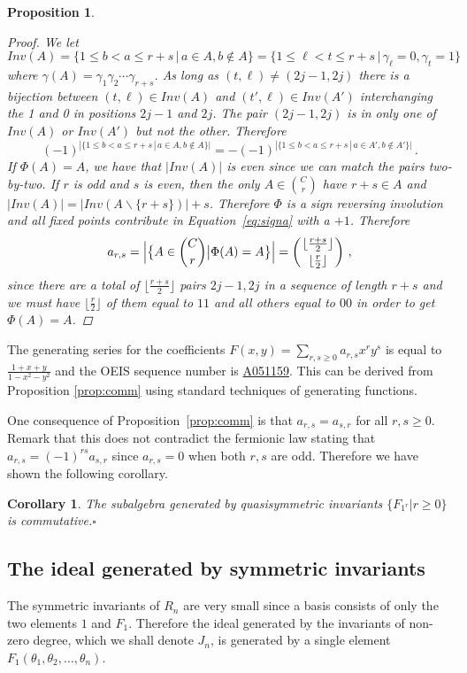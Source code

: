 \documentclass[11pt]{amsart}
\newtheorem{prop}[theorem]{Proposition}
\newtheorem{cor}[theorem]{Corollary}
\theoremstyle{definition}
\numberwithin{equation}{section}
\newcommand{\mike}[1]{\todo[size=\tiny,color=lime!30]{#1 \\ \hfill --- Mike}}
\begin{document}
\begin{prop}
\begin{proof}
We let
 $$Inv(A)=\{1\le b<a\le r+s\,|\,a\in A, b\not\in A\}=\{1\le \ell<t\le r+s\,|\,\gamma_\ell=0,\gamma_t=1 \}\,$$
 where $\gamma(A)=\gamma_1\gamma_2\cdots\gamma_{r+s}$.
As long as $(t,\ell)\ne(2j-1,2j)$ there is a bijection between $(t,\ell)\in Inv(A)$ and
$(t',\ell)\in Inv(A')$ interchanging the 1 and 0 in positions $2j-1$ and $2j$.
The pair $(2j-1,2j)$ is in only one of $Inv(A)$ or $Inv(A')$ but not the other. Therefore
$$(-1)^{|\{1\le b<a\le r+s\,|\,a\in A, b\not\in A\}|} = -(-1)^{|\{1\le b<a\le r+s\,|\,a\in A', b\not\in A'\}|}\,.$$
If $\Phi(A)=A$, we have that $|Inv(A)|$ is even since we can match the pairs two-by-two.
If $r$ is odd and $s$ is even, then the only $A \in \binom{C}{r}$ have
$r+s \in A$ and $|Inv(A)| = |Inv(A \backslash \{ r+s \})| + s$.
Therefore $\Phi$ is a sign reversing involution and all fixed points contribute
in Equation~\eqref{eq:signa} with a $+1$. Therefore
$$a_{r,s}=\Big|\big\{ A\in {C\choose r}\big| \Phi(A)=A\big\}\Big|=\left({\lfloor \frac{r+s}{2} \rfloor \atop \lfloor \frac{r}{2} \rfloor}\right)\,,$$
since there are a total of $\lfloor \frac{r+s}{2} \rfloor$ pairs $2j-1,2j$
in a sequence of length $r+s$ and we must have $\lfloor \frac{r}{2} \rfloor$ of them equal to $11$
and all others equal to $00$ in order to get $\Phi(A)=A$.
\end{proof}
\end{prop}

The generating series for the coefficients $F(x,y) = \sum_{r,s \ge 0} a_{r,s} x^{r}y^{s}$ is
equal to $\frac{1 + x + y}{1 - x^{2} - y^{2}}$
and the OEIS \cite{OEIS} sequence number is \href{https://oeis.org/A051159}{A051159}.
This can be derived from Proposition \ref{prop:comm} using standard techniques of generating functions.
\mike{TODO: add comment to OEIS sequence}

One consequence of Proposition~\ref{prop:comm} is that $a_{r,s}=a_{s,r}$ for all $r,s\ge 0$. Remark that this does not contradict the fermionic law stating that $a_{r,s}=(-1)^{rs}a_{s,r}$ since $a_{r,s}=0$ when both $r,s$ are odd. Therefore we have shown the following corollary.

\begin{cor}
The subalgebra generated by quasisymmetric invariants $\{F_{1^r}|r\ge 0\}$ is commutative.\hfill$\square$
\end{cor}

\subsection{The ideal generated by symmetric invariants}
The symmetric invariants of $R_n$ are very small since a basis consists of only the two
elements $1$ and $F_1$.  Therefore the ideal generated by the invariants of non-zero
degree, which we shall denote $J_n$, is generated by a single element
$F_1(\theta_1,\theta_2, \ldots, \theta_n)$.
\end{document}
